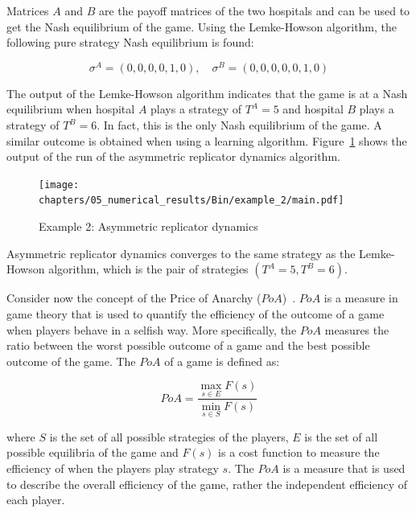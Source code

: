 Matrices \(A\) and \(B\) are the payoff matrices of the two hospitals and
can be used to get the Nash equilibrium of the game.
Using the Lemke-Howson algorithm, the following pure strategy Nash equilibrium
is found:

\begin{equation}
    \sigma^A = (0, 0, 0, 0, 1, 0), \quad
    \sigma^B = (0, 0, 0, 0, 0, 1, 0)
\end{equation}

The output of the Lemke-Howson algorithm indicates that the game is at a Nash
equilibrium when hospital \(A\) plays a strategy of \(T^A = 5\) and hospital
\(B\) plays a strategy of \(T^B = 6\).
In fact, this is the only Nash equilibrium of the game.
A similar outcome is obtained when using a learning algorithm.
Figure~\ref{fig:asymmetric_replicator_dynamics_example_2} shows the output of
the run of the asymmetric replicator dynamics algorithm.

\begin{figure}[H]
    \centering
    \texttt{[image: chapters/05\_numerical\_results/Bin/example\_2/main.pdf]}
    \caption{Example 2: Asymmetric replicator dynamics}
    \label{fig:asymmetric_replicator_dynamics_example_2}
\end{figure}

Asymmetric replicator dynamics converges to the same strategy as the Lemke-
Howson algorithm, which is the pair of strategies \((T^A = 5, T^B = 6)\).

Consider now the concept of the Price of Anarchy
(\(PoA\))~\cite{roughgarden2005selfish}.
\(PoA\) is a measure in game theory that is used to quantify the efficiency of
the outcome of a game when players behave in a selfish way.
More specifically, the \(PoA\) measures the ratio between the worst possible
outcome of a game and the best possible outcome of the game.
The \(PoA\) of a game is defined as:

\begin{equation}\label{eq:poa_definition}
    PoA = \frac{\max_{s \in E}{F(s)}}{\min_{s \in S}{F(s)}}
\end{equation}

where \(S\) is the set of all possible strategies of the players, \(E\) is the
set of all possible equilibria of the game and \(F(s)\) is a cost function to
measure the efficiency of when the players play strategy \(s\).
The \(PoA\) is a measure that is used to describe the overall efficiency of the
game, rather the independent efficiency of each player.

